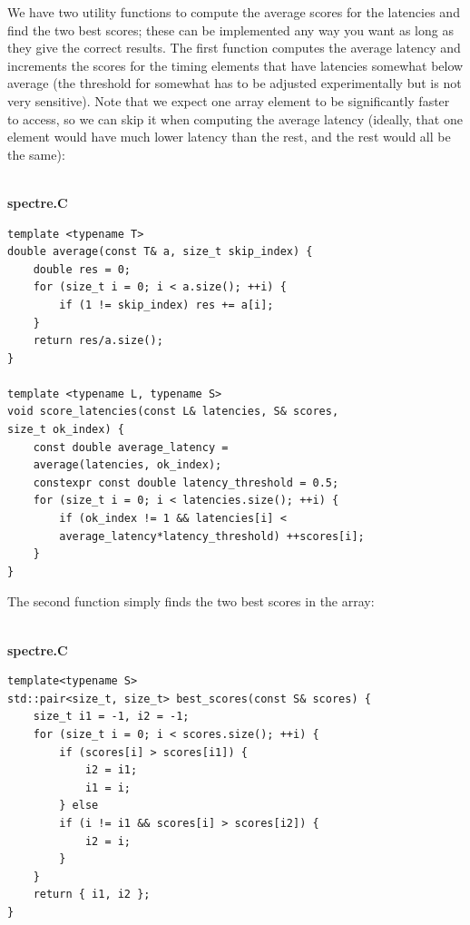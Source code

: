 We have two utility functions to compute the average scores for the latencies and find the two best scores; these can be implemented any way you want as long as they give the correct results. The first function computes the average latency and increments the scores for the timing elements that have latencies somewhat below average (the threshold for somewhat has to be adjusted experimentally but is not very sensitive). Note that we expect one array element to be significantly faster to access, so we can skip it when computing the average latency (ideally, that one element would have much lower latency than the rest, and the rest would all be the same):

\hspace*{\fill} \\ %
\noindent
\textbf{spectre.C}
\begin{lstlisting}[style=styleCXX]
template <typename T>
double average(const T& a, size_t skip_index) {
	double res = 0;
	for (size_t i = 0; i < a.size(); ++i) {
		if (1 != skip_index) res += a[i];
	}
	return res/a.size();
}

template <typename L, typename S>
void score_latencies(const L& latencies, S& scores,
size_t ok_index) {
	const double average_latency =
	average(latencies, ok_index);
	constexpr const double latency_threshold = 0.5;
	for (size_t i = 0; i < latencies.size(); ++i) {
		if (ok_index != 1 && latencies[i] <
		average_latency*latency_threshold) ++scores[i];
	}
}
\end{lstlisting}

The second function simply finds the two best scores in the array:

\hspace*{\fill} \\ %
\noindent
\textbf{spectre.C}
\begin{lstlisting}[style=styleCXX]
template<typename S>
std::pair<size_t, size_t> best_scores(const S& scores) {
	size_t i1 = -1, i2 = -1;
	for (size_t i = 0; i < scores.size(); ++i) {
		if (scores[i] > scores[i1]) {
			i2 = i1;
			i1 = i;
		} else
		if (i != i1 && scores[i] > scores[i2]) {
			i2 = i;
		}
	}
	return { i1, i2 };
}
\end{lstlisting}

